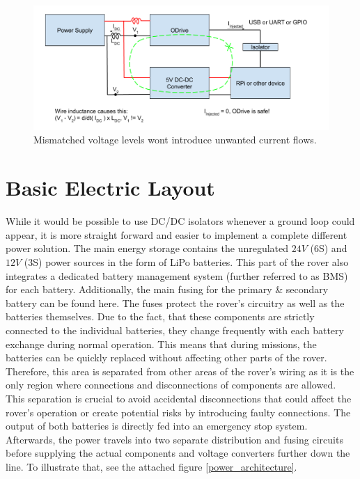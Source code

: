     \begin{figure}[h] %
        \includegraphics[width=\textwidth]{contents/figures/ground_loop_fix.png}
        \caption{Mismatched voltage levels wont introduce unwanted current flows.}
        \label{ground_loop_fix}
    \end{figure}

    \clearpage %
    
\section{Basic Electric Layout}

    While it would be possible to use DC/DC isolators whenever a ground loop could appear, it is more straight forward and easier to implement a complete different power solution. The main energy storage contains the unregulated $24V$ (6S) and $12V$ (3S) power sources in the form of LiPo batteries. This part of the rover also integrates a dedicated battery management system (further referred to as BMS) for each battery. Additionally, the main fusing for the primary \& secondary battery can be found here. The fuses protect the rover's circuitry as well as the batteries themselves. Due to the fact, that these components are strictly connected to the individual batteries, they change frequently with each battery exchange during normal operation. This means that during missions, the batteries can be quickly replaced without affecting other parts of the rover. Therefore, this area is separated from other areas of the rover's wiring as it is the only region where connections and disconnections of components are allowed. This separation is crucial to avoid accidental disconnections that could affect the rover's operation or create potential risks by introducing faulty connections. The output of both batteries is directly fed into an emergency stop system. Afterwards, the power travels into two separate distribution and fusing circuits before supplying the actual components and voltage converters further down the line. To illustrate that, see the attached figure \ref{power_architecture}.
    
